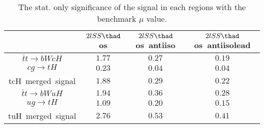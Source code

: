 \begin{table}
\footnotesize
\caption{The stat. only significance of the signal in each regions with the benchmark $\mu$ value.}
\centering
\begin{tabular}{|c|c|c|c|} \hline
 & $2lSS\thad$ os & $2lSS\thad$ os~antiiso & $2lSS\thad$ os~antiisolead\\\hline
$\bar{t}t\to bWcH$ & $1.77$ & $0.27$ & $0.19$\\\hline
$cg\to tH$ & $0.23$ & $0.04$ & $0.04$\\\hline
tcH~merged~signal & $1.88$ & $0.29$ & $0.22$\\\hline
$\bar{t}t\to bWuH$ & $1.94$ & $0.36$ & $0.28$\\\hline
$ug\to tH$ & $1.09$ & $0.20$ & $0.15$\\\hline
tuH~merged~signal & $2.76$ & $0.53$ & $0.41$\\\hline
\end{tabular}
\label{tab:significance}
\end{table}
